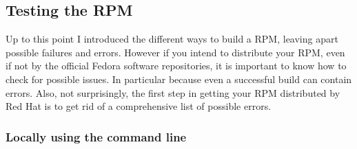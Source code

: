 \subsection{Testing the RPM}
\label{rpmtesting}

Up to this point I introduced the different ways to build a RPM, leaving apart possible failures and errors. 
However if you intend to distribute your RPM, even if not by the official Fedora software repositories, it is important to know 
how to check for possible issues. In particular because even a successful build can contain errors.  
Also, not surprisingly, the first step in getting your RPM distributed by Red Hat is to get rid of 
a comprehensive list of possible errors. 

\subsubsection{Locally using the command line}

